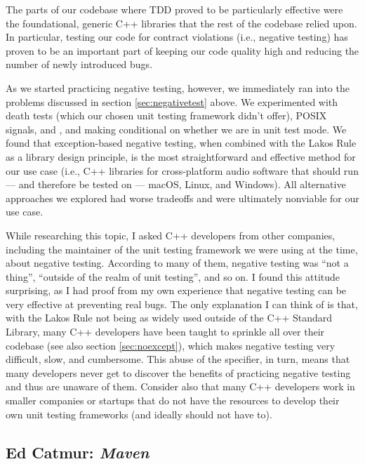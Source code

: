The parts of our codebase where TDD proved to be particularly effective were the foundational, generic C++ libraries that the rest of the codebase relied upon. In particular, testing our code for contract violations (i.e., negative testing) has proven to be an important part of keeping our code quality high and reducing the number of newly introduced bugs. 

As we started practicing negative testing, however, we immediately ran into the problems discussed in section \ref{sec:negativetest} above. We experimented with death tests (which our chosen unit testing framework didn't offer), POSIX signals,  and , and making  conditional on whether we are in unit test mode. We found that exception-based negative testing, when combined with the Lakos Rule as a library design principle, is the most straightforward and effective method for our use case (i.e., C++ libraries for cross-platform audio software that should run --- and therefore be tested on --- macOS, Linux, and Windows). All alternative approaches we explored had worse tradeoffs and were ultimately nonviable for our use case.

While researching this topic, I asked C++ developers from other companies, including the maintainer of the unit testing framework we were using at the time, about negative testing. According to many of them, negative testing was ``not a thing'', ``outside of the realm of unit testing'', and so on. I found this attitude surprising, as I had proof from my own experience that negative testing can be very effective at preventing real bugs. The only explanation I can think of is that, with the Lakos Rule not being as widely used outside of the C++ Standard Library, many C++ developers have been taught to sprinkle  all over their codebase (see also section \ref{sec:noexcept}), which makes negative testing very difficult, slow, and cumbersome. This abuse of the  specifier, in turn, means that many developers never get to discover the benefits of practicing negative testing and thus are unaware of them. Consider also that many C++ developers work in smaller companies or startups that do not have the resources to develop their own unit testing frameworks (and ideally should not have to).

\subsection{Ed Catmur: \emph{Maven}}

